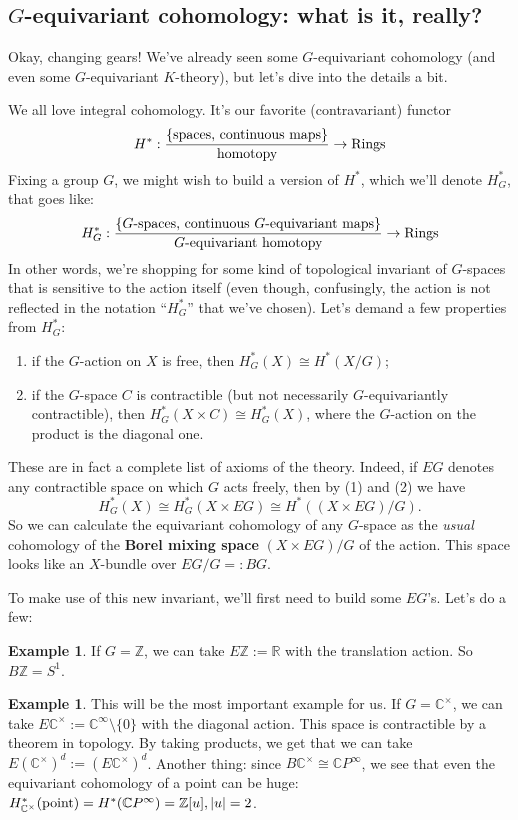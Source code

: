 \documentclass[12pt]{amsart}
\numberwithin{equation}{section}
\theoremstyle{definition}
\newtheorem{Example}[equation]{Example}
\numberwithin{figure}{section}
\newcommand{\Z}{\mathbb{Z}}
\begin{document}
\subsection{$G$-equivariant cohomology: what is it, really?}
Okay, changing gears! We've already seen some $G$-equivariant cohomology (and even some $G$-equivariant $K$-theory), but let's dive into the details a bit.

We all love integral cohomology. It's our favorite (contravariant) functor 
\[H^*: \frac{\{\textup{spaces, continuous maps}\}}{\textup{homotopy}} \to \textup{Rings}\]
Fixing a group $G$, we might wish to build a version of $H^*$, which we'll denote $H^*_G$, that goes like:
\[H_G^*: \frac{\{\textup{$G$-spaces, continuous $G$-equivariant maps}\}}{\textup{$G$-equivariant homotopy}} \to \textup{Rings}\]
In other words, we're shopping for some kind of topological invariant of $G$-spaces that is sensitive to the action itself (even though, confusingly, the action is not reflected in the notation ``$H_G^*$'' that we've chosen). Let's demand a few properties from $H_G^*$:
\begin{enumerate}
    \item if the $G$-action on $X$ is free, then $H_G^*(X) \cong H^*(X/G)$;
    \item if the $G$-space $C$ is contractible (but not necessarily $G$-equivariantly contractible), then $H_G^*(X \times C) \cong H_G^*(X)$, where the $G$-action on the product is the diagonal one.
\end{enumerate}
These are in fact a complete list of axioms of the theory.  Indeed, if $EG$ denotes any contractible space on which $G$ acts freely, then by (1) and (2) we have 
\[ H_G^*(X) \cong H_G^*(X\times EG) \cong H^*( (X\times EG)/G).\]
So we can calculate the equivariant cohomology of any $G$-space as the \textit{usual} cohomology of the \textbf{Borel mixing space} $(X\times EG)/G$ of the action. This space looks like an $X$-bundle over $EG/G =: BG$. 

To make use of this new invariant, we'll first need to build some $EG$'s. Let's do a few:

\begin{Example}
If $G=\Z$, we can take $E\Z := \mathbb{R}$ with the translation action. So $B\Z = S^1$.
\end{Example}

\begin{Example}
This will be the most important example for us. If $G=\mathbb{C}^\times$, we can take $E\mathbb{C}^\times := \mathbb{C}^\infty \setminus \{0\}$ with the diagonal action.  This space is contractible by a theorem in topology. By taking products, we get that we can take $E(\mathbb{C}^\times)^d := (E\mathbb{C}^\times)^d$. Another thing: since $B\mathbb{C}^\times \cong \mathbb{C}P^\infty$, we see that even the equivariant cohomology of a point can be huge: $H_{\mathbb{C}^\times}^*(\textup{point}) = H^*(\mathbb{C}P^\infty) = \mathbb{Z}[u], |u|=2$.
\end{Example}
\end{document}
